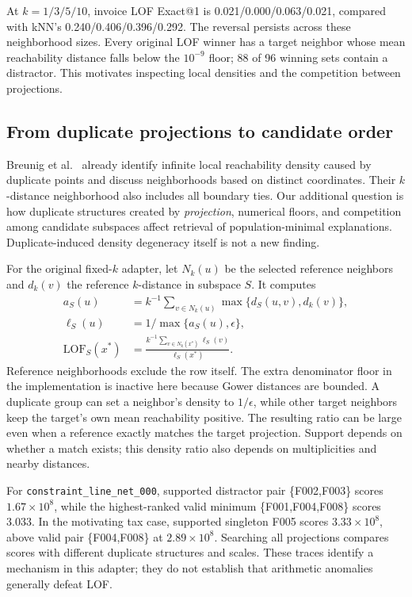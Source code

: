 \documentclass[conference]{IEEEtran}
\begin{document}
At $k=1/3/5/10$, invoice LOF Exact@1 is 0.021/0.000/0.063/0.021, compared with kNN's 0.240/0.406/0.396/0.292. The reversal persists across these neighborhood sizes. Every original LOF winner has a target neighbor whose mean reachability distance falls below the $10^{-9}$ floor; 88 of 96 winning sets contain a distractor. This motivates inspecting local densities and the competition between projections.

\subsection{From duplicate projections to candidate order}
Breunig et al.~\cite{breunig2000lof} already identify infinite local reachability density caused by duplicate points and discuss neighborhoods based on distinct coordinates. Their $k$-distance neighborhood also includes all boundary ties. Our additional question is how duplicate structures created by \emph{projection}, numerical floors, and competition among candidate subspaces affect retrieval of population-minimal explanations. Duplicate-induced density degeneracy itself is not a new finding.

For the original fixed-$k$ adapter, let $N_k(u)$ be the selected reference neighbors and $d_k(v)$ the reference $k$-distance in subspace $S$. It computes
\begin{align}
a_S(u)&=k^{-1}\sum_{v\in N_k(u)}\max\{d_S(u,v),d_k(v)\},\\
\ell_S(u)&=1/\max\{a_S(u),\epsilon\},\\
\mathrm{LOF}_S(x^*)&=\frac{k^{-1}\sum_{v\in N_k(x^*)}\ell_S(v)}{\ell_S(x^*)}.
\end{align}
Reference neighborhoods exclude the row itself. The extra denominator floor in the implementation is inactive here because Gower distances are bounded. A duplicate group can set a neighbor's density to $1/\epsilon$, while other target neighbors keep the target's own mean reachability positive. The resulting ratio can be large even when a reference exactly matches the target projection. Support depends on whether a match exists; this density ratio also depends on multiplicities and nearby distances.

For \texttt{constraint\_line\_net\_000}, supported distractor pair \{F002,F003\} scores $1.67\times10^8$, while the highest-ranked valid minimum \{F001,F004,F008\} scores 3.033. In the motivating tax case, supported singleton F005 scores $3.33\times10^8$, above valid pair \{F004,F008\} at $2.89\times10^8$. Searching all projections compares scores with different duplicate structures and scales. These traces identify a mechanism in this adapter; they do not establish that arithmetic anomalies generally defeat LOF.
\end{document}
